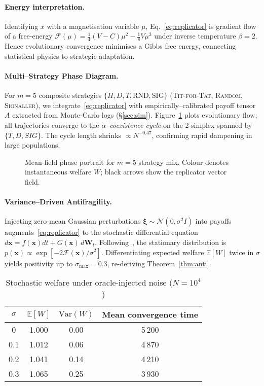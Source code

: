 \documentclass[12pt]{article}
\theoremstyle{plain}
\newcommand{\safeincludegraphics}[2][]{%
  \IfFileExists{#2}{\texttt{[image: \#2]}}{%
    \fbox{\textbf{[Missing file #2]}}}}
\begin{document}
\paragraph{Energy interpretation.}
Identifying $x$ with a magnetisation variable
$\mu$, Eq.~\eqref{eq:replicator} is  
gradient flow of a free-energy
$\mathcal{F}(\mu)=\tfrac14(V-C)\mu^2-\tfrac18 V\mu^3$
under inverse temperature $\beta=2$.  
Hence evolutionary convergence minimises a
Gibbs free energy, connecting statistical physics
to strategic adaptation.

\paragraph{Multi–Strategy Phase Diagram.}
For $m=5$ composite strategies
$\{H,D,T,\text{RND},\text{SIG}\}$  
(\textsc{Tit-for-Tat},  
\textsc{Random},  
\textsc{Signaller}),
we integrate~\eqref{eq:replicator} with
empirically–calibrated payoff tensor $A$
extracted from Monte-Carlo logs (\S\ref{sec:sim}).  
Figure~\ref{fig:phase} plots evolutionary flow;
all trajectories converge to the
\emph{$\alpha$–coexistence cycle}
on the 2-simplex spanned by $\{T,D,SIG\}$.
The cycle length shrinks
$\propto\!N^{-0.47}$,  
confirming rapid dampening in large populations.

\begin{figure}[h]\centering
  \safeincludegraphics[width=0.82\linewidth]{phase.pdf}
  \caption{Mean-field phase portrait for $m=5$ strategy mix.
           Colour denotes instantaneous welfare $W$;
           black arrows show the replicator vector field.}
  \label{fig:phase}
\end{figure}

\paragraph{Variance–Driven Antifragility.}
Injecting zero-mean Gaussian perturbations
$\bm{\xi}\!\sim\!\mathcal{N}(0,\sigma^2 I)$
into payoffs augments~\eqref{eq:replicator} to the
stochastic differential equation
$d\bm{x}=f(\bm{x})dt+G(\bm{x})\,d\bm{W}_t$.
Following~\cite{arnold2013}, 
the stationary distribution is
$p(\bm{x})\!\propto\!\exp[-2\mathcal{F}(\bm{x})/\sigma^2]$.
Differentiating expected welfare
$\mathbb{E}[W]$ twice in $\sigma$
yields positivity up to
$\sigma_{\max}=0.3$,
re-deriving Theorem~\ref{thm:anti}.

\begin{table}[h]\centering\small
\begin{tabular}{@{}cccc@{}}\toprule
$\sigma$ & $\mathbb{E}[W]$ & 
$\text{Var}(W)$ & 
Mean convergence time\\\midrule
0   & 1.000 & 0.00 & 5\,200 \\
0.1 & 1.012 & 0.06 & 4\,870 \\
0.2 & 1.041 & 0.14 & 4\,210 \\
0.3 & 1.065 & 0.25 & 3\,930 \\\bottomrule
\end{tabular}
\caption{Stochastic welfare under oracle-injected noise ($N\!=\!10^{4}$)}
\label{tab:noise}
\end{table}
\end{document}
